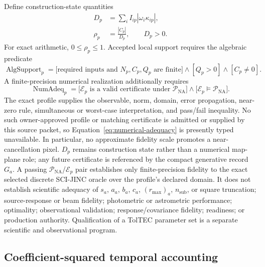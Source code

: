 Define construction-state quantities
\begin{align}
  D_p &= \sum_i I_{ip}\left|\omega_i\kappa_{ip}\right|,
    \label{eq:absolute-sum}\\
  \rho_p &= \frac{|C_p|}{D_p}, \qquad D_p>0.
    \label{eq:cancellation-ratio}
\end{align}
For exact arithmetic, $0\le\rho_p\le1$.  Accepted local support requires
the algebraic predicate
\begin{equation}
  \operatorname{AlgSupport}_p=
  \bigl[\text{required inputs and }N_p,C_p,Q_p\text{ are finite}\bigr]
  \land[Q_p>0]\land[C_p\ne0].
  \label{eq:algebraic-support}
\end{equation}
A finite-precision numerical realization additionally requires
\begin{equation}
  \operatorname{NumAdeq}_p=
  \bigl[\mathcal{E}_p\text{ is a valid certificate under }
        \mathcal{P}_{\mathrm{NA}}\bigr]
  \land
  \bigl[\mathcal{E}_p\models\mathcal{P}_{\mathrm{NA}}\bigr].
  \label{eq:numerical-adequacy}
\end{equation}
The exact profile supplies the observable, norm, domain, error propagation,
near-zero rule, simultaneous or worst-case interpretation, and pass/fail
inequality.  No such owner-approved profile or matching certificate is
admitted or supplied by this source packet, so
Equation~\eqref{eq:numerical-adequacy} is presently typed unavailable.  In
particular, no approximate fidelity scale promotes a near-cancellation pixel.
$D_p$ remains construction state rather than a numerical map-plane role; any
future certificate is referenced by the compact generative record $G_a$.
A passing $\mathcal{P}_{\mathrm{NA}}$/$\mathcal{E}_p$ pair establishes only
finite-precision fidelity to the exact selected discrete SCI-JINC oracle over
the profile's declared domain.  It does not establish scientific adequacy of
$s_a$, $a_a$, $b_a$, $c_a$, $(r_{\max})_a$, $n_{\mathrm{sub}}$, or square
truncation; source-response or beam fidelity; photometric or astrometric
performance; optimality; observational validation; response/covariance
fidelity; readiness; or production authority.  Qualification of a TolTEC
parameter set is a separate scientific and observational program.

\subsection{Coefficient-squared temporal accounting}
\label{sec:coefficient-time}


